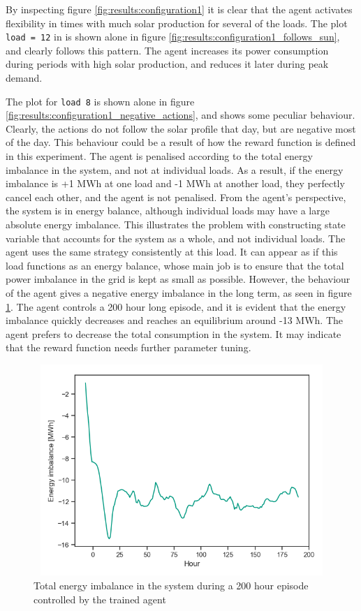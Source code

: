 \documentclass[class=book, crop=false, 11pt]{standalone}
\begin{document}
By inspecting figure \ref{fig:results:configuration1} it is clear that the agent activates flexibility in times with much solar production for several of the loads. The plot \texttt{load = 12} in is shown alone in figure \ref{fig:results:configuration1_follows_sun}, and clearly follows this pattern. The agent increases its power consumption during periods with high solar production, and reduces it later during peak demand.



The plot for \texttt{load 8} is shown alone in figure \ref{fig:results:configuration1_negative_actions}, and shows some peculiar behaviour. Clearly, the actions do not follow the solar profile that day, but are negative most of the day. This behaviour could be a result of how the reward function is defined in this experiment. The agent is penalised according to the total energy imbalance in the system, and not at individual loads. As a result, if the energy imbalance is +1 MWh at one load and -1 MWh at another load, they perfectly cancel each other, and the agent is not penalised. From the agent's perspective, the system is in energy balance, although individual loads may have a large absolute energy imbalance. This illustrates the problem with constructing state variable that accounts for the system as a whole, and not individual loads. The agent uses the same strategy consistently at this load. It can appear as if this load functions as an energy balance, whose main job is to ensure that the total power imbalance in the grid is kept as small as possible. However, the behaviour of the agent gives a negative energy imbalance in the long term, as seen in figure \ref{fig:results:configuration1_energy_imbalance}. The agent controls a 200 hour long episode, and it is evident that the energy imbalance quickly decreases and reaches an equilibrium around -13 MWh. The agent prefers to decrease the total consumption in the system. It may indicate that the reward function needs further parameter tuning.
\begin{figure}[H]
    \center
\includegraphics[height=8cm, width=12cm]{figures/configuration1_imbalance.png}
    \caption[size = 9]{Total energy imbalance in the system during a 200 hour episode controlled by the trained agent}
    \label{fig:results:configuration1_energy_imbalance}
\end{figure}
\end{document}
